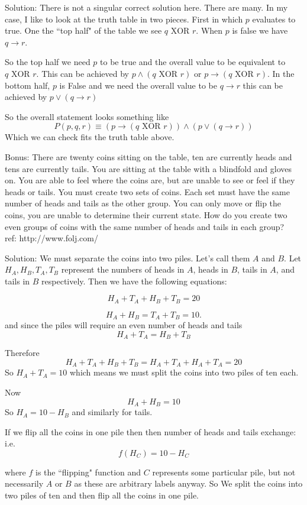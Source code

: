 \documentclass[16 pt]{amsart}
\theoremstyle{definition}
\theoremstyle{remark}
\numberwithin{equation}{subsection}
\begin{document}
\vspace{1in}

Solution: There is not a singular correct solution here.  There are many.  In my case, I like to look at the truth table in two pieces.  First in which $p$ evaluates to true.  One the ``top half" of the table we see $q \text{ XOR } r$.  When $p$ is false we have $q\rightarrow r$.

So the top half we need $p$ to be true and the overall value to be equivalent to $q \text{ XOR } r$.  This can be achieved by $p\wedge (q \text{ XOR } r)$ or $p\rightarrow (q\text{ XOR } r)$.  In the bottom half, $p$ is False and we need the overall value to be $q\rightarrow r$ this can be achieved by $p \vee (q\rightarrow r)$

So the overall statement looks something like
\[
P(p,q,r) \equiv (p\rightarrow (q\text{ XOR } r))\wedge (p \vee (q\rightarrow r))
\]
Which we can check fits the truth table above.


\newpage

Bonus: There are twenty coins sitting on the table, ten are currently heads and tens are currently tails. You are sitting at the table with a blindfold and gloves on. You are able to feel where the coins are, but are unable to see or feel if they heads or tails. You must create two sets of coins. Each set must have the same number of heads and tails as the other group. You can only move or flip the coins, you are unable to determine their current state. How do you create two even groups of coins with the same number of heads and tails in each group?\\

ref: http://www.folj.com/


\vspace{1in}

Solution: We must separate the coins into two piles.  Let's call them $A$ and $B$.  Let $H_A, H_B, T_A, T_B$ represent the numbers of heads in $A$, heads in $B$, tails in $A$, and tails in $B$ respectively.  Then we have the following equations:

\[
H_A + T_A + H_B + T_B = 20
\]

\[
H_A + H_B = T_A + T_B = 10.
\]
and since the piles will require an even number of heads and tails
\[
H_A + T_A = H_B + T_B
\]

Therefore 
\[
H_A + T_A + H_B + T_B = H_A + T_A + H_A + T_A = 20
\]
So $H_A + T_A = 10$ which means we must split the coins into two piles of ten each.

Now 
\[
H_A + H_B = 10
\]
So $H_A = 10 - H_B$ and similarly for tails.

If we flip all the coins in one pile then then number of heads and tails exchange: i.e.
\[
f(H_C) = 10 - H_C 
\]

where $f$ is the ``flipping" function and $C$ represents some particular pile, but not necessarily $A$ or $B$ as these are arbitrary labels anyway.  
So We split the coins into two piles of ten and then flip all the coins in one pile.  
\end{document}
